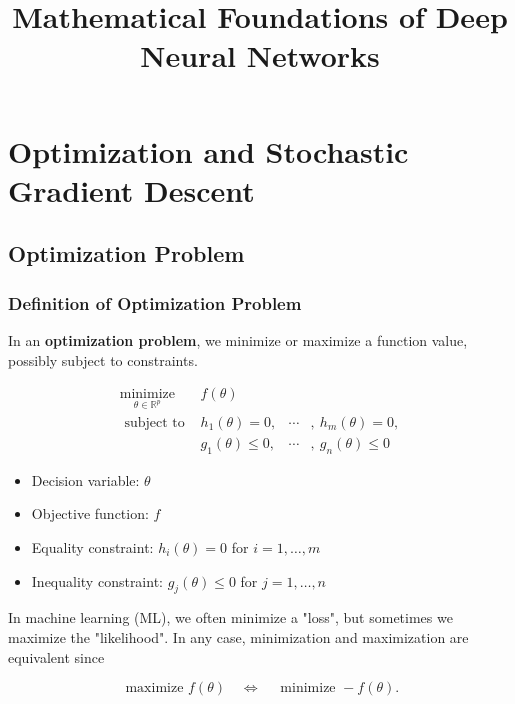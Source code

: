 \documentclass{report}
\begin{document}
\title{Mathematical Foundations of Deep Neural Networks}
\author{}
\date{}
\maketitle
\tableofcontents

\part{Optimization and Stochastic Gradient Descent}

\chapter{Optimization Problem}

\section{Definition of Optimization Problem}

\begin{definition}
    In an \textbf{optimization problem}, we minimize or maximize a function value, possibly subject to constraints.

    $$
    \begin{array}{ll}
    \underset{\theta \in \mathbb{R}^{p}}{\operatorname{minimize}} & f(\theta) \\
    \text { subject to } & h_{1}(\theta)=0, & \cdots & , \ h_{m}(\theta)=0, \\
    & g_{1}(\theta) \le 0, & \cdots & , \ g_{n}(\theta) \le 0
    \end{array}
    $$

    \begin{itemize}
        \item Decision variable: $\theta$
        \item Objective function: $f$
        \item Equality constraint: $h_{i}(\theta)=0$ for $i=1, \ldots, m$
        \item Inequality constraint: $g_{j}(\theta) \leq 0$ for $j=1, \ldots, n$
    \end{itemize}
\end{definition}

In machine learning (ML), we often minimize a "loss", but sometimes we maximize the "likelihood".
In any case, minimization and maximization are equivalent since

$$
\text { maximize } f(\theta) \quad \Leftrightarrow \quad \text { minimize }-f(\theta).
$$
\end{document}
